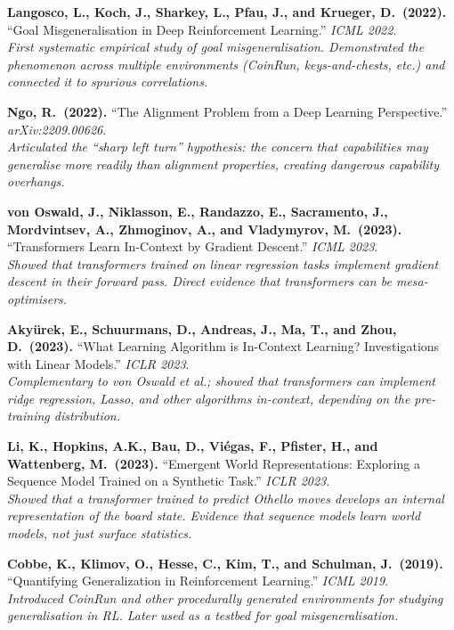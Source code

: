 \documentclass[11pt,a4paper]{article}
\theoremstyle{definition}
\begin{document}
\begin{enumerate}[label={[\arabic*]},leftmargin=2em]
\item \textbf{Langosco, L., Koch, J., Sharkey, L., Pfau, J., and
  Krueger, D.\ (2022).}
  ``Goal Misgeneralisation in Deep Reinforcement Learning.''
  \textit{ICML 2022}.\\
  \textit{First systematic empirical study of goal misgeneralisation.
  Demonstrated the phenomenon across multiple environments (CoinRun,
  keys-and-chests, etc.) and connected it to spurious correlations.}

\item \textbf{Ngo, R.\ (2022).}
  ``The Alignment Problem from a Deep Learning Perspective.''
  \textit{arXiv:2209.00626}.\\
  \textit{Articulated the ``sharp left turn'' hypothesis: the concern
  that capabilities may generalise more readily than alignment
  properties, creating dangerous capability overhangs.}

\item \textbf{von Oswald, J., Niklasson, E., Randazzo, E.,
  Sacramento, J., Mordvintsev, A., Zhmoginov, A., and Vladymyrov, M.\ (2023).}
  ``Transformers Learn In-Context by Gradient Descent.''
  \textit{ICML 2023}.\\
  \textit{Showed that transformers trained on linear regression tasks
  implement gradient descent in their forward pass. Direct evidence
  that transformers can be mesa-optimisers.}

\item \textbf{Aky\"urek, E., Schuurmans, D., Andreas, J., Ma, T.,
  and Zhou, D.\ (2023).}
  ``What Learning Algorithm is In-Context Learning? Investigations
  with Linear Models.''
  \textit{ICLR 2023}.\\
  \textit{Complementary to von Oswald et al.; showed that transformers
  can implement ridge regression, Lasso, and other algorithms
  in-context, depending on the pre-training distribution.}

\item \textbf{Li, K., Hopkins, A.K., Bau, D., Vi\'egas, F.,
  Pfister, H., and Wattenberg, M.\ (2023).}
  ``Emergent World Representations: Exploring a Sequence Model Trained
  on a Synthetic Task.''
  \textit{ICLR 2023}.\\
  \textit{Showed that a transformer trained to predict Othello moves
  develops an internal representation of the board state. Evidence
  that sequence models learn world models, not just surface statistics.}

\item \textbf{Cobbe, K., Klimov, O., Hesse, C., Kim, T., and
  Schulman, J.\ (2019).}
  ``Quantifying Generalization in Reinforcement Learning.''
  \textit{ICML 2019}.\\
  \textit{Introduced CoinRun and other procedurally generated environments
  for studying generalisation in RL. Later used as a testbed for
  goal misgeneralisation.}

\end{enumerate}
\end{document}
